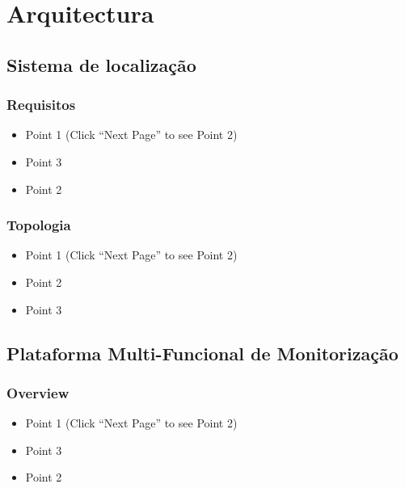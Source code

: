\documentclass[]{beamer}
\begin{document}
\section{Arquitectura}


\subsection{Sistema de localização}

\begin{frame}
  \frametitle{Requisitos}   %

  \begin{itemize}
  \item<1-> Point 1 (Click ``Next Page'' to see Point 2) %
  \item<3-> Point 3
  \item<2-> Point 2  %
  \end{itemize}
\end{frame}

\begin{frame}
  \frametitle{Topologia}   %

  \begin{itemize}
  \item<1-> Point 1 (Click ``Next Page'' to see Point 2) %
  \item<2-> Point 2  %
  \item<3-> Point 3
  \end{itemize}
\end{frame}

\subsection{Plataforma Multi-Funcional de Monitorização}

\begin{frame}
  \frametitle{Overview}   %

  \begin{itemize}
  \item<1-> Point 1 (Click ``Next Page'' to see Point 2) %
  \item<3-> Point 3
  \item<2-> Point 2  %
  \end{itemize}
\end{frame}
\end{document}
